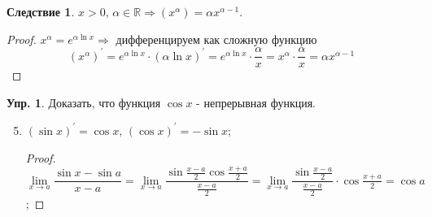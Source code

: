 \documentclass[12pt]{article}
\newcommand{\MR}{\mathbb{R}}
\theoremstyle{definition}
\newtheorem{exrc}{Упр.}
\newtheorem{corollary}{Следствие}
\begin{document}
\begin{corollary}
	$x > 0, \, \alpha \in \MR \Rightarrow (x^\alpha) = \alpha x^{\alpha-1}$.
\end{corollary}
\begin{proof}
	$x^\alpha = e^{\alpha \ln{x}} \Rightarrow$ дифференцируем как сложную функцию $$ (x^\alpha)^\prime = e^{\alpha \ln{x}}{\cdot}(\alpha \ln{x})^\prime =  e^{\alpha \ln{x}}{\cdot}\dfrac{\alpha}{x} = x^\alpha{\cdot}\dfrac{\alpha}{x} = \alpha x^{\alpha-1}$$
\end{proof}
\begin{exrc}
	Доказать, что функция $\cos{x}$ - непрерывная функция.
\end{exrc}
\begin{enumerate}[label={(\arabic*)}]
	\setcounter{enumi}{4}
	\item $(\sin{x})^\prime = \cos{x}, \, (\cos{x})^\prime = -\sin{x}$;
		\begin{proof}
			$\lim\limits_{x \to a}\dfrac{\sin{x} - \sin{a}}{x-a} = \lim\limits_{x \to a}\dfrac{\sin{\tfrac{x-a}{2}}\cos{\tfrac{x+a}{2}}}{\tfrac{x-a}{2}} = \lim\limits_{x \to a}\dfrac{\sin{\tfrac{x-a}{2}}}{\tfrac{x-a}{2}}{\cdot}\cos{\tfrac{x+a}{2}} = \cos{a}$;
			

\end{proof}
\end{enumerate}
\end{document}
